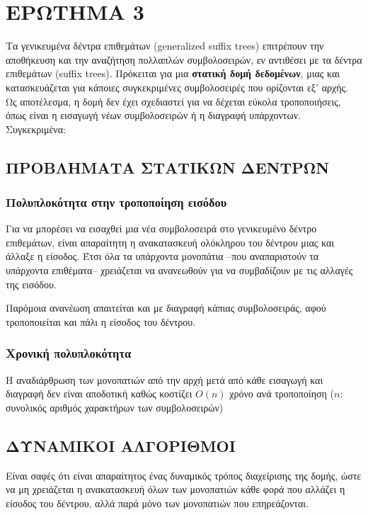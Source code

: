 \chapter{ΕΡΩΤΗΜΑ 3}

    Τα γενικευμένα δέντρα επιθεμάτων (generalized suffix trees) επιτρέπουν την αποθήκευση και την αναζήτηση πολλαπλών συμβολοσειρών, εν αντιθέσει με τα δέντρα επιθεμάτων (suffix trees).
    Πρόκειται για μια \textbf{στατική δομή δεδομένων}, μιας και κατασκευάζεται για κάποιες συγκεκριμένες συμβολοσειρές που ορίζονται εξ' αρχής.
    Ως αποτέλεσμα, η δομή δεν έχει σχεδιαστεί για να δέχεται εύκολα τροποποιήσεις, όπως είναι η εισαγωγή νέων συμβολοσειρών ή η διαγραφή υπάρχοντων. Συγκεκριμένα:

    \section{ΠΡΟΒΛΗΜΑΤΑ ΣΤΑΤΙΚΩΝ ΔΕΝΤΡΩΝ}
        \subsection{Πολυπλοκότητα στην τροποποίηση εισόδου}
            Για να μπορέσει να εισαχθεί μια νέα συμβολοσειρά στο γενικευμένο δέντρο επιθεμάτων, είναι απαραίτητη η ανακατασκευή ολόκληρου του δέντρου μιας και άλλαξε η είσοδος.
            Έτσι όλα τα υπάρχοντα μονοπάτια --που αναπαριστούν τα υπάρχοντα επιθέματα-- χρειάζεται να ανανεωθούν για να συμβαδίζουν με τις αλλαγές της εισόδου.

            Παρόμοια ανανέωση απαιτείται και με διαγραφή κάπιας συμβολοσειράς, αφού τροποποιείται και πάλι η είσοδος του δέντρου.

        \subsection{Χρονική πολυπλοκότητα}
            Η αναδιάρθρωση των μονοπατιών από την αρχή μετά από κάθε εισαγωγή και διαγραφή δεν είναι αποδοτική καθώς κοστίζει \(O(n)\) χρόνο ανά τροποποίηση (\(n\): συνολικός αριθμός χαρακτήρων των συμβολοσειρών)

    \section{ΔΥΝΑΜΙΚΟΙ ΑΛΓΟΡΙΘΜΟΙ}
        Είναι σαφές ότι είναι απαραίτητος ένας δυναμικός τρόπος διαχείρισης της δομής, ώστε να μη χρειάζεται η ανακατασκευή όλων των μονοπατιών κάθε φορά που αλλάζει η είσοδος του δέντρου, αλλά παρά μόνο των μονοπατιών που επηρεάζονται.

